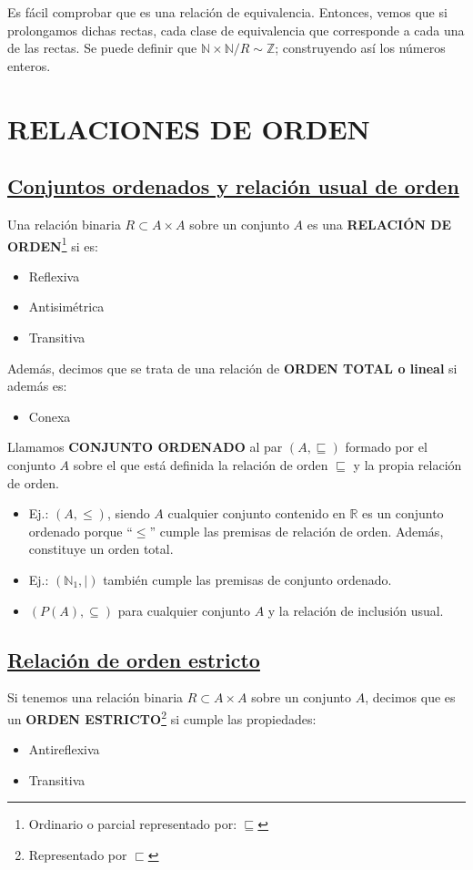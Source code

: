 \documentclass[10pt,a4paper,openright]{book}
\begin{document}
Es fácil comprobar que es una relación de equivalencia. Entonces, vemos que si prolongamos dichas rectas, cada clase de equivalencia que corresponde a cada una de las rectas. Se puede definir que $\mathbb N\times \mathbb N/R \sim \mathbb Z$; construyendo así los números enteros.

\section*{RELACIONES DE ORDEN}
\subsection*{\underline{Conjuntos ordenados y relación usual de orden}}
Una relación binaria $R\subset A\times A$ sobre un conjunto $A$ es una \textbf{RELACIÓN DE ORDEN}\footnote{Ordinario o parcial representado por: $\sqsubseteq$} si es:
\begin{itemize}
\item Reflexiva
\item Antisimétrica
\item Transitiva
\end{itemize}

Además, decimos que se trata de una relación de \textbf{ORDEN TOTAL o lineal} si además es:
\begin{itemize}
\item Conexa
\end{itemize}

Llamamos \textbf{CONJUNTO ORDENADO} al par $(A, \sqsubseteq)$ formado por el conjunto $A$ sobre el que está definida la relación de orden $\sqsubseteq$ y la propia relación de orden.
\begin{itemize}
\item Ej.: $(A,\leq )$, siendo $A$ cualquier conjunto contenido en $\mathbb R$ es un conjunto ordenado porque ``$\leq$'' cumple las premisas de relación de orden. Además, constituye un orden total.

\item Ej.: $(\mathbb N_1, \mid)$ también cumple las premisas de conjunto ordenado.

\item $(P(A), \subseteq )$ para cualquier conjunto $A$ y la relación de inclusión usual.
\end{itemize}

\subsection*{\underline{Relación de orden estricto}}
Si tenemos una relación binaria $R\subset A\times A$ sobre un conjunto $A$, decimos que es un \textbf{ORDEN ESTRICTO}\footnote{Representado por $\sqsubset$} si cumple las propiedades:
\begin{itemize}
\item Antireflexiva
\item Transitiva
\end{itemize}
\end{document}
